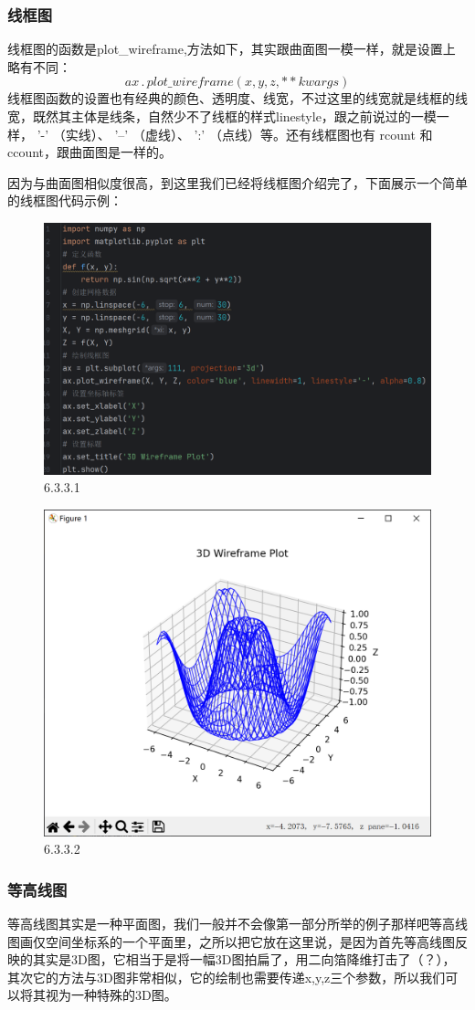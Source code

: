 \documentclass[12pt]{article}
\begin{document}
\subsubsection{线框图}
线框图的函数是plot\_wireframe,方法如下，其实跟曲面图一模一样，就是设置上略有不同：
\[ax\,.\,plot\_wireframe(x,y,z,**kwargs)\]
线框图函数的设置也有经典的颜色、透明度、线宽，不过这里的线宽就是线框的线宽，既然其主体是线条，自然少不了线框的样式linestyle，跟之前说过的一模一样，  '-'  （实线）、  '--'  （虚线）、  ':'  （点线）等。还有线框图也有 rcount 和 ccount，跟曲面图是一样的。

因为与曲面图相似度很高，到这里我们已经将线框图介绍完了，下面展示一个简单的线框图代码示例：
\begin{figure}[H]
    \centering
    \includegraphics[width=0.75\linewidth]{3D 线框图 program1.png}
    \caption{6.3.3.1}
    \label{fig:enter-label}
\end{figure}
\begin{figure}[H]
    \centering
    \includegraphics[width=0.5\linewidth]{3D 线框图 Pic1.png}
    \caption{6.3.3.2}
    \label{fig:enter-label}
\end{figure}
\newpage
\subsubsection{等高线图}
等高线图其实是一种平面图，我们一般并不会像第一部分所举的例子那样吧等高线图画仅空间坐标系的一个平面里，之所以把它放在这里说，是因为首先等高线图反映的其实是3D图，它相当于是将一幅3D图拍扁了，用二向箔降维打击了（？），其次它的方法与3D图非常相似，它的绘制也需要传递x,y,z三个参数，所以我们可以将其视为一种特殊的3D图。
\end{document}
